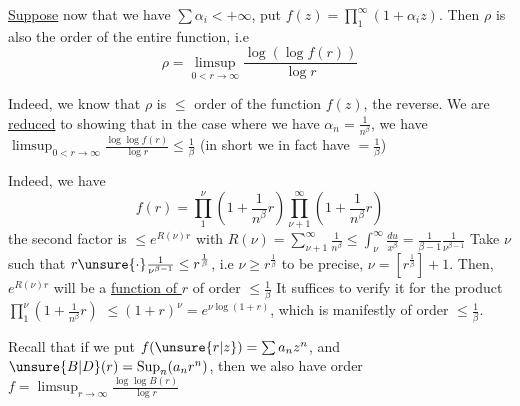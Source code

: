 \uline{Suppose} now that we have $\sum\alpha_i<+\infty$,
put $f(z)=\prod_1^\infty(1+\alpha_i z)$. Then $\rho$ is also
the order of the entire function, i.e
\[ \rho=\limsup_{0<r\to\infty}\frac{\log(\log f(r))}{\log r} \]

Indeed, we know that $\rho$ is $\leq$ order of the
function $f(z)$,   the reverse. We are
\uline{reduced} to showing that   in the
case where we have $\alpha_n=\frac1{n^\beta}$, we have
$\displaystyle \limsup_{0<r\to\infty}\frac{\log\log f(r)}{\log r}\leq\frac1\beta$ \quad (in short we in fact have $=\frac1\beta$)

Indeed, we have
\[ f(r)=\prod_1^\nu\left(1+\frac1{n^\beta}r\right)\prod_{\nu+1}^{\infty}\left(1+\frac1{n^\beta}r\right) \]
the second factor is $\leq e^{R(\nu)r}$
with $\displaystyle R(\nu)=\sum_{\nu+1}^\infty\frac1{n^\beta}\leq\int_\nu^\infty\frac{du}{x^\beta}=\frac1{\beta-1}\frac1{\nu^{\beta-1}}$
Take $\nu$ such that $r\unsure{\cdot}\frac1{\nu^{\beta-1}}\leq r^{\frac1\beta}$, i.e $\nu\geq r^{\frac1\beta}$
to be precise, $\nu=[r^{\frac1\beta}]+1$. Then, $e^{R(\nu)r}$
will be a \uline{function of $r$} of order $\leq\frac1\beta$ It
suffices to verify it for the product $\prod_1^\nu(1+\frac1{n^\beta}r)$
$\leq(1+r)^\nu=e^{\nu\log(1+r)}$, which is manifestly
of order $\leq\frac1\beta$.

Recall that if we put $f(\unsure{r|z})=\sum a_n z^n$,
 and $\unsure{B|D}(r)=\mathop{\rm Sup}_n(a_n r^n)$, then we
also have \qquad order  $f=\limsup_{r\to\infty}\frac{\log\log B(r)}{\log r}$
